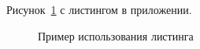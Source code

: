 
Рисунок~\ref{src:src3} с листингом в приложении.

\begin{figure}
%
\caption{Пример использования листинга}
\label{src:src3}
\end{figure}